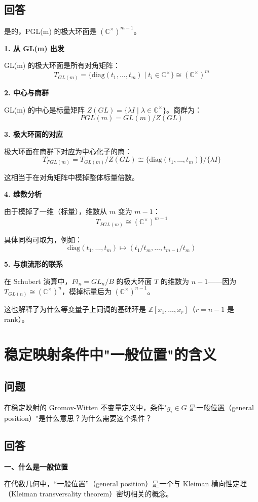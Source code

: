 \subsection{回答}
是的，PGL(m) 的极大环面是 $(\mathbb{C}^{\times})^{m-1}$。

\textbf{1. 从 GL(m) 出发}

GL(m) 的极大环面是所有对角矩阵：
$$T_{GL(m)} = \{\text{diag}(t_1, \ldots, t_m) \mid t_i \in \mathbb{C}^{\times}\} \cong (\mathbb{C}^{\times})^m$$

\textbf{2. 中心与商群}

GL(m) 的中心是标量矩阵 $Z(GL) = \{\lambda I \mid \lambda \in \mathbb{C}^{\times}\}$。商群为：
$$PGL(m) = GL(m) / Z(GL)$$

\textbf{3. 极大环面的对应}

极大环面在商群下对应为中心化子的商：
$$T_{PGL(m)} = T_{GL(m)} / Z(GL) \cong \{\text{diag}(t_1, \ldots, t_m)\} / \{\lambda I\}$$

这相当于在对角矩阵中模掉整体标量倍数。

\textbf{4. 维数分析}

由于模掉了一维（标量），维数从 $m$ 变为 $m-1$：
$$T_{PGL(m)} \cong (\mathbb{C}^{\times})^{m-1}$$

具体同构可取为，例如：
$$\text{diag}(t_1, \ldots, t_m) \mapsto (t_1/t_m, \ldots, t_{m-1}/t_m)$$

\textbf{5. 与旗流形的联系}

在 Schubert 演算中，$Fl_n = GL_n / B$ 的极大环面 $T$ 的维数为 $n-1$——因为 $T_{GL(n)} \cong (\mathbb{C}^{\times})^n$，模掉标量后为 $(\mathbb{C}^{\times})^{n-1}$。

这也解释了为什么等变量子上同调的基础环是 $\mathbb{Z}[x_1, \ldots, x_r]$（$r = n-1$ 是 rank）。

\section{稳定映射条件中"一般位置"的含义}\label{sec:qa-general-position}
\subsection{问题}
在稳定映射的 Gromov-Witten 不变量定义中，条件"$g_i \in G$ 是一般位置（general position）"是什么意思？为什么需要这个条件？
\subsection{回答}
\textbf{一、什么是一般位置}

在代数几何中，``一般位置''（general position）是一个与 Kleiman 横向性定理（Kleiman transversality theorem）密切相关的概念。


